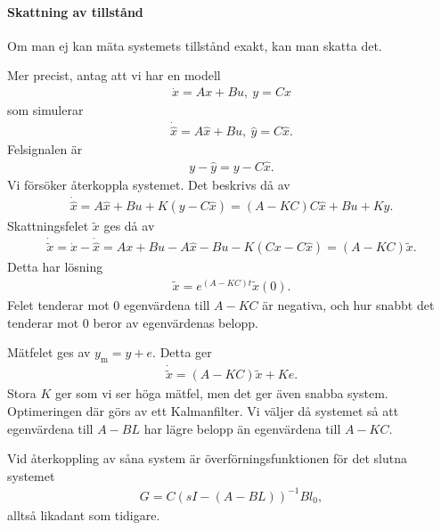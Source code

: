\paragraph{Skattning av tillstånd}
Om man ej kan mäta systemets tillstånd exakt, kan man skatta det.

Mer precist, antag att vi har en modell
\begin{align*}
	\dot{x} = Ax + Bu,\ y = Cx
\end{align*}
som simulerar
\begin{align*}
	\dot{\hat{x}} = A\hat{x} + Bu,\  \hat{y} = C\hat{x}.
\end{align*}
Felsignalen är
\begin{align*}
	y - \hat{y} = y - C\hat{x}.
\end{align*}
Vi försöker återkoppla systemet. Det beskrivs då av
\begin{align*}
	\dot{\hat{x}} = A\hat{x} + Bu + K(y- C\hat{x}) = (A - KC)C\hat{x} + Bu + Ky.
\end{align*}
Skattningsfelet $\tilde{x}$ ges då av
\begin{align*}
	\dot{\tilde{x}} = \dot{x} - \dot{\hat{x}} = Ax + Bu - A\hat{x} - Bu - K(Cx - C\hat{x}) = (A - KC)\tilde{x}.
\end{align*}
Detta har lösning
\begin{align*}
	\tilde{x} = e^{(A - KC)t}\tilde{x}(0).
\end{align*}
Felet tenderar mot $0$ egenvärdena till $A - KC$ är negativa, och hur snabbt det tenderar mot $0$ beror av egenvärdenas belopp.

Mätfelet ges av $y_{\text{m}} = y + e$. Detta ger
\begin{align*}
	\dot{\tilde{x}} = (A - KC)\tilde{x} + Ke.
\end{align*}
Stora $K$ ger som vi ser höga mätfel, men det ger även snabba system. Optimeringen där görs av ett Kalmanfilter. Vi väljer då systemet så att egenvärdena till $A - BL$ har lägre belopp än egenvärdena till $A - KC$.

Vid återkoppling av såna system är överförningsfunktionen för det slutna systemet
\begin{align*}
	G = C(sI - (A - BL))^{-1}Bl_{0},
\end{align*}
alltså likadant som tidigare.